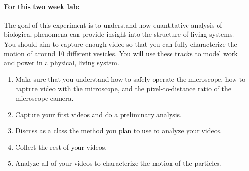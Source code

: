 \paragraph{For this two week lab:} The goal of this experiment is to understand how quantitative analysis of biological phenomena can provide insight into the structure of living systems. You should aim to capture enough video so that you can fully characterize the motion of around 10 different vesicles. You will use these tracks to model work and power in a physical, living system.
\begin{enumerate}
\item Make sure that you understand how to safely operate the microscope, how to capture video with the microscope, and the pixel-to-distance ratio of the microscope camera.
\item Capture your first videos and do a preliminary analysis.
\item Discuss as a class the method you plan to use to analyze your videos.
\item Collect the rest of your videos.
\item Analyze all of your videos to characterize the motion of the particles.
\end{enumerate}

